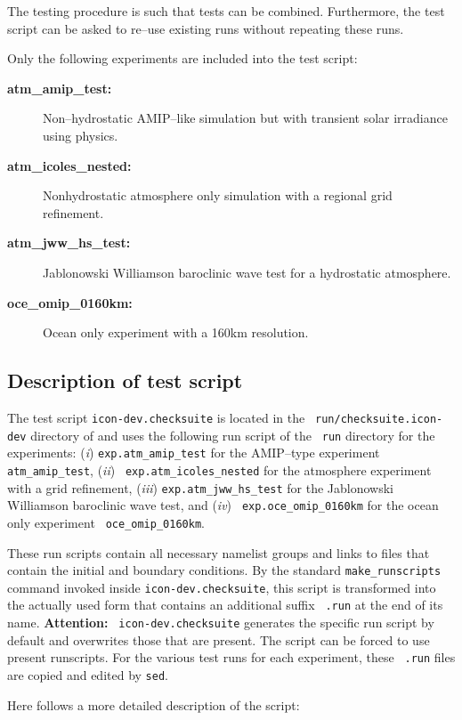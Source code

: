 The testing procedure is such that tests can be
combined. Furthermore, the test script can be asked to re--use
existing runs without repeating these runs.

Only the following experiments are included into the test script:
\begin{description}
\item[{\bf atm\_amip\_test:}] Non--hydrostatic AMIP--like simulation but with
  transient solar irradiance using \echam{} physics.
\item[{\bf atm\_icoles\_nested:}] Nonhydrostatic atmosphere only
  simulation with a regional 
  grid refinement.
\item[{\bf atm\_jww\_hs\_test:}] Jablonowski Williamson baroclinic
  wave test for a hydrostatic atmosphere.
\item[{\bf oce\_omip\_0160km:}] Ocean only experiment with a 160km
  resolution.
\end{description}

\subsection{Description of test script}

The test script {\tt icon-dev.checksuite} is located in the {\tt
  run/checksuite.icon-dev} 
directory of \icon{} and uses the following run script of the {\tt
  run} directory for the
experiments: ({\it i}\/) {\tt exp.atm\_amip\_test} for the
AMIP--type experiment {\tt atm\_amip\_test}, ({\it ii}\/) {\tt
  exp.atm\_icoles\_nested} for the atmosphere experiment with a grid
refinement, 
({\it iii}\/) {\tt exp.atm\_jww\_hs\_test} for the Jablonowski
Williamson baroclinic wave test, and  ({\it iv}\/) {\tt
  exp.oce\_omip\_0160km} for the ocean only experiment {\tt
  oce\_omip\_0160km}.


These run scripts contain all
necessary namelist groups and links to files that contain the initial
and boundary conditions. By the standard {\tt make\_runscripts}
command invoked inside {\tt icon-dev.checksuite}, this 
script is transformed into the actually used form that contains an
additional suffix {\tt
  .run} at the end of its name. {\bf Attention:} {\tt
  icon-dev.checksuite} generates the 
specific run script by default and overwrites those that are
present. The script can be 
forced to use present runscripts.
For the various test runs for each experiment, these {\tt
  .run} files are copied and edited by {\tt sed}.

Here follows a more detailed description of the script:

